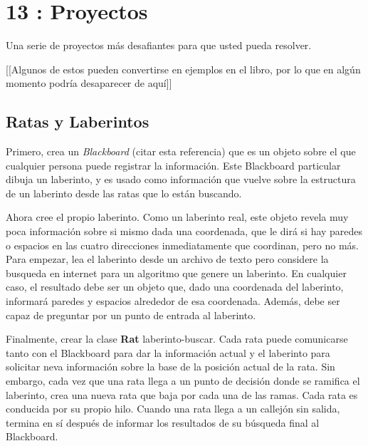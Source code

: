 \section*{13 : Proyectos}
\label{sec:proy}

Una serie de proyectos más desafiantes para que usted pueda resolver. \newline

[[Algunos de estos pueden convertirse en ejemplos en el libro, por lo que en algún momento podría desaparecer de aquí]]


\subsection*{Ratas y Laberintos}
\label{subsec:ratas}

Primero, crea un \textit{Blackboard }\newline(citar esta referencia) que es un objeto sobre el que cualquier persona puede registrar la información. Este Blackboard particular  dibuja un laberinto, y es usado como información que vuelve sobre la estructura de un laberinto desde  las ratas que lo están  buscando. \newline

Ahora cree el propio laberinto. Como un laberinto real, este objeto revela muy poca información sobre si mismo \-dada una coordenada, que le dirá si hay paredes o espacios en las cuatro direcciones  inmediatamente que coordinan, pero no más.  Para empezar, lea el laberinto desde un archivo de texto pero considere la busqueda en internet para un algoritmo que genere un laberinto. En cualquier caso, el resultado debe ser un objeto que, dado una coordenada del laberinto, informará paredes y espacios alrededor de esa coordenada. Además, debe ser capaz de preguntar por un punto de entrada al laberinto.  \newline

Finalmente, crear la clase \textbf{Rat} laberinto-buscar. Cada rata puede comunicarse tanto con el Blackboard para dar la información actual y el laberinto para solicitar neva información sobre la base de la posición actual de la rata. Sin embargo, cada vez que una rata llega a un punto de decisión donde se ramifica el laberinto, crea una nueva rata que baja por cada una de las ramas. Cada rata es conducida por su propio hilo. Cuando una rata llega a un callejón sin salida, termina en sí después de informar los resultados de su búsqueda final al Blackboard.\newline

